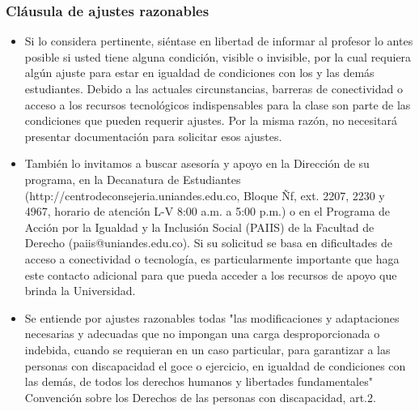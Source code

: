 \documentclass[
  shownotes,
  xcolor={svgnames},
  hyperref={colorlinks,citecolor=DarkBlue,linkcolor=DarkRed,urlcolor=DarkBlue}
  ]{beamer}
\begin{document}
\begin{frame}
\frametitle{Cláusula de ajustes razonables}

\begin{itemize}
  \footnotesize
\item  Si lo considera pertinente, siéntase en libertad de informar al profesor lo antes posible si usted tiene alguna condición, visible o invisible, por la cual requiera algún ajuste para estar en igualdad de condiciones con los y las demás estudiantes. Debido a las actuales circunstancias, barreras de conectividad o acceso a los recursos tecnológicos indispensables para la clase son parte de las condiciones que pueden requerir ajustes. Por la misma razón, no necesitará presentar documentación para solicitar esos ajustes.

\item  También lo invitamos a buscar asesoría y apoyo en la Dirección de su programa, en la Decanatura de Estudiantes (http://centrodeconsejeria.uniandes.edu.co, Bloque Ñf, ext. 2207, 2230 y 4967, horario de atención L-V 8:00 a.m. a 5:00 p.m.) o en el Programa de Acción por la Igualdad y la Inclusión Social (PAIIS) de la Facultad de Derecho (paiis@uniandes.edu.co). Si su solicitud se basa en dificultades de acceso a conectividad o tecnología, es particularmente importante que haga este contacto adicional para que pueda acceder a los recursos de apoyo que brinda la Universidad.

\item  Se entiende por ajustes razonables todas "las modificaciones y adaptaciones necesarias y adecuadas que no impongan una carga desproporcionada o indebida, cuando se requieran en un caso particular, para garantizar a las personas con discapacidad el goce o ejercicio, en igualdad de condiciones con las demás, de todos los derechos humanos y libertades fundamentales" Convención sobre los Derechos de las personas con discapacidad, art.2.
\end{itemize}
\end{frame}
\end{document}
